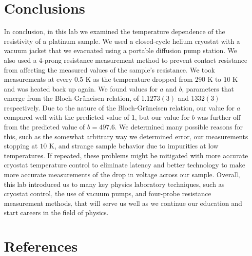 \documentclass[11pt,letterpaper]{article}
\begin{document}
\section{Conclusions}

In conclusion, in this lab we examined the temperature dependence of the resistivity of a platinum sample. We used a closed-cycle helium cryostat with a vacuum jacket that we evacuated using a portable diffusion pump station. We also used a 4-prong resistance measurement method to prevent contact resistance from affecting the measured values of the sample's resistance. We took measurements at every $0.5$ K as the temperature dropped from $290$ K to $10$ K and was heated back up again. We found values for $a$ and $b$, parameters that emerge from the Bloch-Grüneisen relation, of $1.1273(3)$ and $1332(3)$ respectively. Due to the nature of the Bloch-Grüneisen relation, our value for $a$ compared well with the predicted value of $1$, but our value for $b$ was further off from the predicted value of $b = 497.6$. We determined many possible reasons for this, such as the somewhat arbitrary way we determined error, our measurements stopping at $10$ K, and strange sample behavior due to impurities at low temperatures. If repeated, these problems might be mitigated with more accurate cryostat temperature control to eliminate latency and better technology to make more accurate measurements of the drop in voltage across our sample. Overall, this lab introduced us to many key physics laboratory techniques, such as cryostat control, the use of vacuum pumps, and four-probe resistance measurement methods, that will serve us well as we continue our education and start careers in the field of physics.

\section{References}
\end{document}
